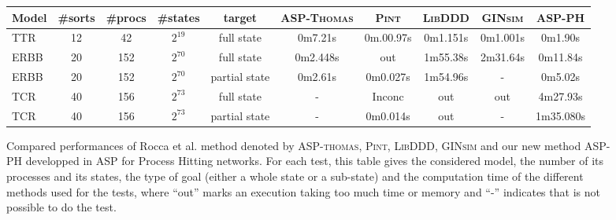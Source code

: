 \begin{figure}[htp]
\begin{center}
\label{tab:reachability}
\noindent%
\begin{tabular}{|l|c|c|c|c||c|c|c|c|c|}
  \hline
   Model&  \#sorts &\#procs & \#states & target & \textsc{ASP-Thomas} & \textsc{Pint} & \textsc{LibDDD} & \textsc{GINsim} & \textsc{ASP-PH} \\
  \hline
  TTR & 12 &42 & $2^{19}$ & full state & 0m7.21s & 0m.00.97s & 0m1.151s &  0m1.001s & 0m1.90s \\
  \hline
  ERBB & 20 &152 & $2^{70}$ & full state & 0m2.448s & out &1m55.38s & 2m31.64s & 0m11.84s \\
  \hline
  ERBB & 20 &152 & $2^{70}$ & partial state & 0m2.61s & 0m0.027s &1m54.96s & - & 0m5.02s \\
  \hline
  TCR & 40 &156 & $2^{73}$ & full state & - & Inconc & out & out & 4m27.93s \\
  \hline
   TCR & 40 &156 & $2^{73}$ & partial state & - & 0m0.014s & out & - & 1m35.080s \\
  \hline
\end{tabular}
\caption{Compared performances of Rocca et al. method denoted by \textsc{ASP-thomas}, \textsc{Pint}, \textsc{LibDDD}, \textsc{GINsim} and our new method \textsc{ASP-PH} developped in ASP for Process Hitting networks.
For each test, this table gives the considered model,
the number of its processes and its states, the type of goal
(either a whole state or a sub-state)
and the computation time of the different methods used for the tests,
where “out” marks an execution taking too much time or memory
and “-” indicates that is not possible to do the test.
}
\end{center}
\end{figure}

